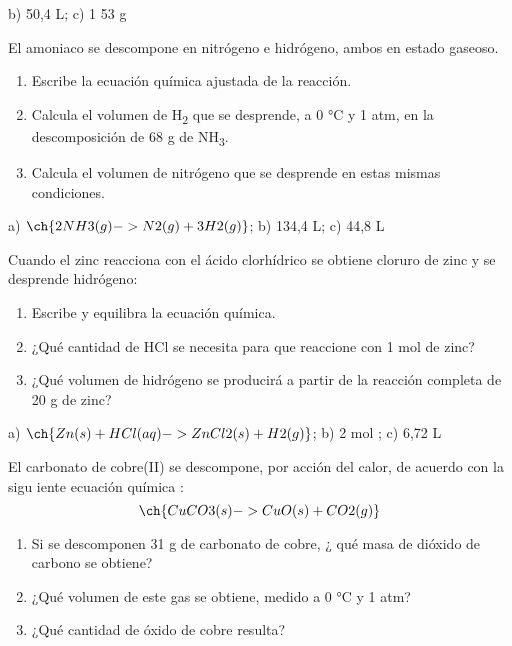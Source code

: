 \documentclass[
]{article}
\providecommand{\tightlist}{%
  \setlength{\itemsep}{0pt}\setlength{\parskip}{0pt}}
\begin{document}
\begin{solution}b) 50,4 L; c) 1 53 g\end{solution}

\begin{exercise}El amoniaco se descompone en nitrógeno e hidrógeno,
ambos en estado gaseoso.

\begin{enumerate}
\def\labelenumi{\alph{enumi})}
\tightlist
\item
  Escribe la ecuación química ajustada de la reacción.
\item
  Calcula el volumen de H\textsubscript{2} que se desprende, a 0 °C y 1
  atm, en la descomposición de 68 g de NH\textsubscript{3}.
\item
  Calcula el volumen de nitrógeno que se desprende en estas mismas
  condiciones.
\end{enumerate}

\end{exercise}

\begin{solution}a) \(\ch{2 NH3(g) -> N2(g) + 3 H2(g)}\); b) 134,4 L; c)
44,8 L\end{solution}

\begin{exercise}Cuando el zinc reacciona con el ácido clorhídrico se
obtiene cloruro de zinc y se desprende hidrógeno:

\begin{enumerate}
\def\labelenumi{\alph{enumi})}
\tightlist
\item
  Escribe y equilibra la ecuación química.
\item
  ¿Qué cantidad de HCl se necesita para que reaccione con 1 mol de zinc?
\item
  ¿Qué volumen de hidrógeno se producirá a partir de la reacción
  completa de 20 g de zinc?
\end{enumerate}

\end{exercise}

\begin{solution}a) \(\ch{Zn(s) + HCl(aq) -> ZnCl2(s) + H2(g)}\); b) 2
mol ; c) 6,72 L\end{solution}

\begin{exercise}El carbonato de cobre(II) se descompone, por acción del
calor, de acuerdo con la sigu iente ecuación química :
\[\ch{CuCO3(s) -> CuO(s) + CO2(g)}\]

\begin{enumerate}
\def\labelenumi{\alph{enumi})}
\tightlist
\item
  Si se descomponen 31 g de carbonato de cobre, ¿ qué masa de dióxido de
  carbono se obtiene?
\item
  ¿Qué volumen de este gas se obtiene, medido a 0 °C y 1 atm?
\item
  ¿Qué cantidad de óxido de cobre resulta?
\end{enumerate}

\end{exercise}
\end{document}
